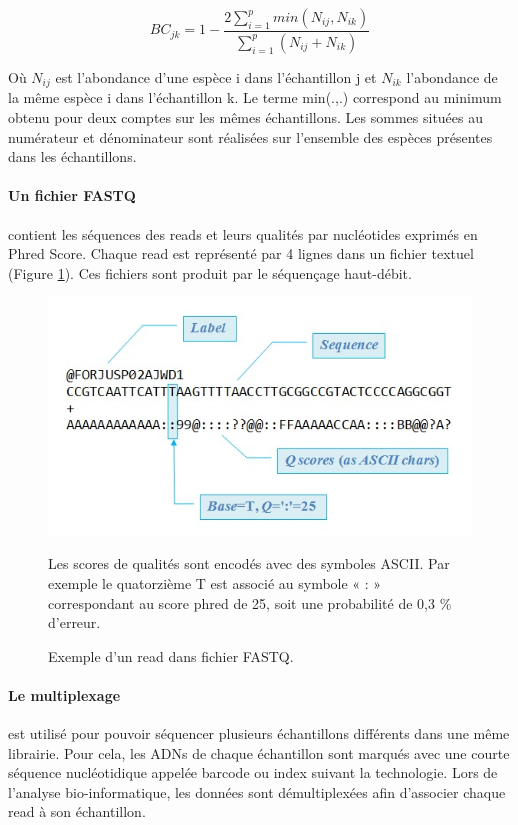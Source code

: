 \documentclass[12pt,a4paper]{article}
\begin{document}
\begin{mycapequ}[!h]
   \begin{equation}
    BC_{jk} = 1 - \frac{2\sum_{i=1}^{p}min(N_{ij},N_{ik})}{\sum_{i=1}^{p}(N_{ij} + N_{ik})}
   \end{equation}
      \caption{Où $N_{ij}$ est l'abondance d'une  espèce i dans l'échantillon j et $N_{ik}$ l'abondance de la même espèce i dans l'échantillon k. Le terme min(.,.) correspond au minimum obtenu pour deux comptes sur les mêmes échantillons. Les sommes situées au numérateur et dénominateur sont réalisées sur l'ensemble des espèces présentes dans les échantillons.}
\end{mycapequ}


\paragraph{Un fichier FASTQ} contient les séquences des reads et leurs qualités par nucléotides exprimés en Phred Score. Chaque read est représenté par 4 lignes dans un fichier textuel (Figure \ref{fastq}). Ces fichiers sont produit par le séquençage haut-débit.

\begin{figure}[!h]
\begin{center}
\includegraphics[scale=0.6]{img/fastq.jpg}\hfill
\end{center}
\caption{Exemple d'un  read dans fichier FASTQ.}
Les scores de qualités sont encodés avec des symboles ASCII. Par exemple le quatorzième T  est associé au symbole « : » correspondant au score phred de 25, soit une probabilité de 0,3 \% d'erreur.
\label{fastq}
\end{figure}

\paragraph{Le multiplexage} est utilisé pour pouvoir séquencer plusieurs échantillons différents dans une même librairie. Pour cela, les ADNs de chaque échantillon sont marqués avec une courte séquence nucléotidique appelée barcode ou index suivant la technologie. Lors de l'analyse bio-informatique, les données sont démultiplexées afin d'associer chaque read à son échantillon.
\end{document}
